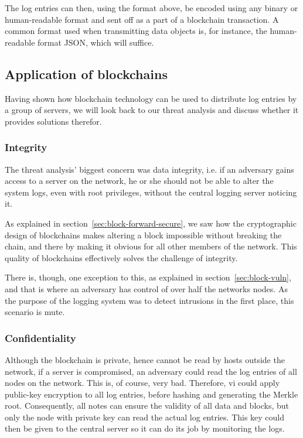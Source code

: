 The log entries can then, using the format above, be encoded using any
binary or human-readable format and sent off as a part of a blockchain
transaction. A common format used when transmitting data objects is,
for instance, the human-readable format JSON, which will suffice.


\subsection{Application of blockchains}
Having shown how blockchain technology can be used to distribute log
entries by a group of servers, we will look back to our threat
analysis and discuss whether it provides solutions therefor.

\subsubsection{Integrity}
The threat analysis' biggest concern was data integrity, i.e. if an
adversary gains access to a server on the network, he or she should
not be able to alter the system logs, even with root privileges,
without the central logging server noticing it.

As explained in section~\ref{sec:block-forward-secure}, we saw how the
cryptographic design of blockchains makes altering a block impossible
without breaking the chain, and there by making it obvious for all
other members of the network. This quality of blockchains effectively
solves the challenge of integrity.

There is, though, one exception to this, as explained in
section~\ref{sec:block-vuln}, and that is where an adversary has
control of over half the networks nodes. As the purpose of the logging
system was to detect intrusions in the first place, this scenario is
mute.

\subsubsection{Confidentiality}
Although the blockchain is private, hence cannot be read by hosts
outside the network, if a server is compromised, an adversary could
read the log entries of all nodes on the network. This is, of course,
very bad. Therefore, vi could apply public-key encryption to all log
entries, before hashing and generating the Merkle root. Consequently,
all notes can ensure the validity of all data and blocks, but only the
node with private key can read the actual log entries. This key could
then be given to the central server so it can do its job by monitoring
the logs.

